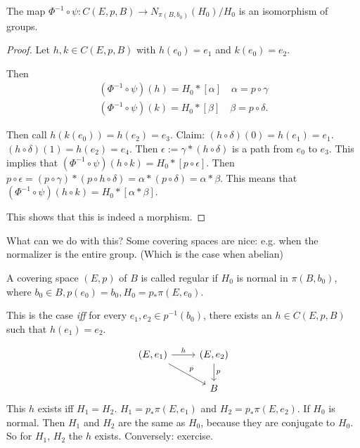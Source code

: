 \begin{theorem}
    The map $\Phi^{-1}  \circ  \psi: C(E, p, B) \to  N_{\pi(B,b_0) }(H_0) / H_0$ is an isomorphism of groups.
\end{theorem}
\begin{proof}
    Let $h, k \in C(E, p, B)$ with $h(e_0) = e_1$ and $k(e_0) = e_2$.

\begin{figure}[H]
    \centering
    \label{fig:isomorphism-of-groups}
\end{figure}

Then 
\begin{align*}
    (\Phi^{-1}  \circ  \psi)(h) = H_0 * [\alpha] \quad \alpha = p  \circ  \gamma\\
    (\Phi^{-1}  \circ  \psi)(k) = H_0 * [\beta] \quad \beta = p  \circ  \delta
.\end{align*}

Then call $h(k(e_0)) = h(e_2) = e_3$.
Claim: $(h  \circ  \delta)(0) = h(e_1) = e_1$.
$(h  \circ  \delta)(1) = h(e_2) = e_4$.
Then $\epsilon:= \gamma * (h  \circ  \delta)$ is a path from $e_0$ to $e_3$.
This implies that $(\Phi^{-1}  \circ  \psi)(h  \circ  k) = H_0 * [p  \circ  \epsilon]$.
Then $p  \circ  \epsilon = (p  \circ  \gamma) * (p  \circ  h  \circ  \delta) = \alpha * (p  \circ  \delta) = \alpha * \beta$.
This means that $(\Phi^{-1}  \circ  \psi)(h  \circ  k) = H_0 * [\alpha * \beta]$.

This shows that this is indeed a morphism.
\end{proof}


What can we do with this?
Some covering spaces are nice: e.g. when the normalizer is the entire group. (Which is the case when abelian)

\begin{definition}
    A covering space $(E, p)$ of $B$ is called regular if $H_0$ is normal in $\pi(B,b_0)$,
    where $b_0 \in B, p(e_0) = b_0, H_0 = p_* \pi(E,e_0) $.
\end{definition}
This is the case \emph{iff} for every $e_1, e_2 \in p^{-1}(b_0)$, there exists an $h \in C(E, p, B)$ such that $h(e_1) = e_2$.

\[
    \begin{tikzcd}
        (E, e_1) \arrow[dr, "p"] \arrow[r, "h"] &(E, e_2) \arrow[d, "p"]\\
                                                & B
    \end{tikzcd}
\]
This $h$ exists iff $H_1 = H_2$. $H_1 = p_* \pi(E,e_1)$ and $H_2 = p_* \pi(E,e_2)$.
If $H_0$ is normal. Then $H_1$ and $H_2$ are the same as $H_0$, because they are conjugate to $H_0$. So for $H_1$, $H_2$ the $h$ exists.
Conversely: exercise.

